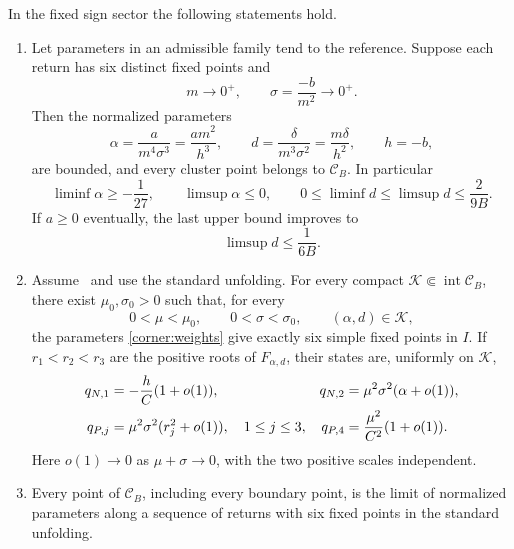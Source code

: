 \begin{proposition}
\label{corner:complete-cluster-set}
\label{thm:saturation-geometry}
\label{cor:saturation-domain-limit}
In the fixed sign sector the following statements hold.
\begin{enumerate}
\item
Let parameters in an admissible family tend to the reference.  Suppose each return has six distinct fixed points and
\[
 m\longrightarrow0^+,\qquad
 \sigma=\frac{-b}{m^2}\longrightarrow0^+.
\]
Then the normalized parameters
\begin{equation}\label{corner:normalized-observations}
 \alpha=\frac{a}{m^4\sigma^3}
        =\frac{am^2}{h^3},
 \qquad
 d=\frac{\delta}{m^3\sigma^2}
   =\frac{m\delta}{h^2},\qquad h=-b,
\end{equation}
are bounded, and every cluster point belongs to $\mathcal C_B$.
In particular
\begin{equation}\label{corner:sharp-cluster-bounds}
 \liminf\alpha\geq-\frac1{27},\qquad
 \limsup\alpha\leq0,\qquad
 0\leq\liminf d\leq\limsup d\leq\frac2{9B}.
\end{equation}
If $a\geq0$ eventually, the last upper bound improves to
\begin{equation}\label{corner:nonnegative-offset-bound}
 \limsup d\leq\frac1{6B}.
\end{equation}

\item
Assume~\cite[(\ref*{main-eq:rank})]{main2026} and use the standard
unfolding. For every compact
$\mathcal K\Subset\operatorname{int}\mathcal C_B$, there exist
$\mu_0,\sigma_0>0$ such that, for every
\[
 0<\mu<\mu_0,\qquad 0<\sigma<\sigma_0,\qquad
 (\alpha,d)\in\mathcal K,
\]
the parameters \eqref{corner:weights} give exactly six simple fixed points
in $I$.  If $r_1<r_2<r_3$ are the positive roots of
$F_{\alpha,d}$, their states are, uniformly on $\mathcal K$,
\begin{align}
 q_{N,1}&=-\frac hC(1+o(1)),&
 q_{N,2}&=\mu^2\sigma^2(\alpha+o(1)),\notag\\
 q_{P,j}&=\mu^2\sigma^2(r_j^2+o(1)),\quad 1\leq j\leq3,&
 q_{P,4}&=\frac{\mu^2}{C^2}(1+o(1)).
                                      \label{corner:interior-roots}
\end{align}
Here $o(1)\to0$ as $\mu+\sigma\to0$, with the two positive scales
independent.

\item
Every point of $\mathcal C_B$, including every boundary point, is
the limit of normalized parameters along a sequence of returns with six
fixed points in the standard unfolding.


\end{enumerate}
\end{proposition}

